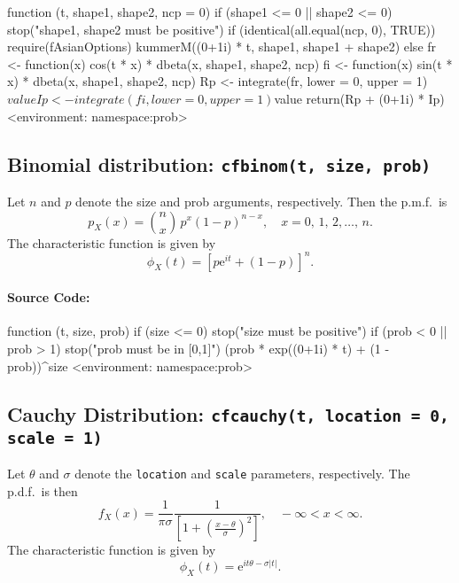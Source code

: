 \documentclass[english]{article}
\newcommand{\me}{\mathrm{e}}
\begin{document}
\begin{Schunk}
\begin{Soutput}
function (t, shape1, shape2, ncp = 0) 
{
    if (shape1 <= 0 || shape2 <= 0) 
        stop("shape1, shape2 must be positive")
    if (identical(all.equal(ncp, 0), TRUE)) {
        require(fAsianOptions)
        kummerM((0+1i) * t, shape1, shape1 + shape2)
    }
    else {
        fr <- function(x) cos(t * x) * dbeta(x, shape1, shape2, 
            ncp)
        fi <- function(x) sin(t * x) * dbeta(x, shape1, shape2, 
            ncp)
        Rp <- integrate(fr, lower = 0, upper = 1)$value
        Ip <- integrate(fi, lower = 0, upper = 1)$value
        return(Rp + (0+1i) * Ip)
    }
}
<environment: namespace:prob>
\end{Soutput}
\end{Schunk}


\subsection{Binomial distribution: \texttt{cfbinom(t, size, prob)}}

Let $n$ and $p$ denote the size and prob arguments, respectively.
Then the p.m.f.~is\[
p_{X}(x)={n \choose x}\, p^{x}(1-p)^{n-x},\quad x=0,\,1,\,2,\ldots,\, n.\]
The characteristic function is given by\[
\phi_{X}(t)=\left[p\me^{it}+(1-p)\right]^{n}.\]



\paragraph*{Source Code:}

\begin{Schunk}
\begin{Soutput}
function (t, size, prob) 
{
    if (size <= 0) 
        stop("size must be positive")
    if (prob < 0 || prob > 1) 
        stop("prob must be in [0,1]")
    (prob * exp((0+1i) * t) + (1 - prob))^size
}
<environment: namespace:prob>
\end{Soutput}
\end{Schunk}


\subsection{Cauchy Distribution: \texttt{cfcauchy(t, location = 0, scale = 1)}}

Let $\theta$ and $\sigma$ denote the \texttt{location} and \texttt{scale}
parameters, respectively. The p.d.f.~is then\[
f_{X}(x)=\frac{1}{\pi\sigma}\frac{1}{\left[1+(\frac{x-\theta}{\sigma})^{2}\right]},\quad-\infty<x<\infty.\]
The characteristic function is given by\[
\phi_{X}(t)=\me^{it\theta-\sigma|t|}.\]
\end{document}
